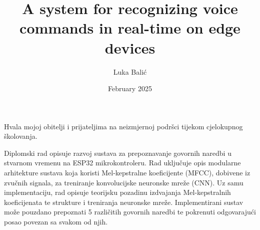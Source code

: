 \documentclass[diplomskirad, upload]{fer}
\title{A system for recognizing voice commands in real-time on edge devices}
\author{Luka Balić}
\date{February 2025}
\begin{document}
\maketitle






\begin{zahvale}
  Hvala mojoj obitelji i prijateljima na neizmjernoj podršci tijekom cjelokupnog školovanja.
\end{zahvale}


\mainmatter


\tableofcontents

%








\begingroup
\small

\endgroup



\begin{sazetak}
  Diplomski rad opisuje razvoj sustava za prepoznavanje govornih naredbi
  u stvarnom vremenu na ESP32 mikrokontroleru. Rad uključuje opis modularne
  arhitekture sustava koja koristi Mel-kepstralne koeficijente (MFCC),
  dobivene iz zvučnih signala, za treniranje konvolucijske
  neuronske mreže (CNN). Uz samu implementaciju, rad opisuje teorijsku
  pozadinu izdvajanja Mel-kepstralnih koeficijenata te strukture i
  treniranja neuronske mreže. Implementirani sustav može pouzdano
  prepoznati 5 različitih govornih naredbi te pokrenuti odgovarajući
  posao povezan sa svakom od njih.
\end{sazetak}
\end{document}
